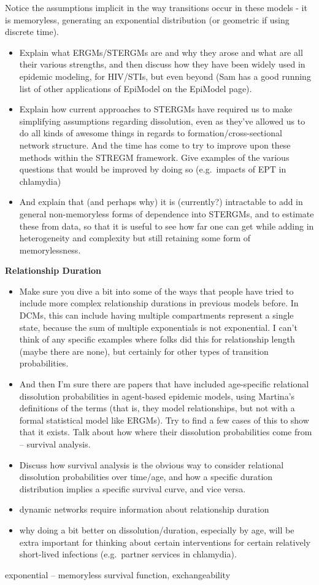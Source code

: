 \documentclass [11pt, proquest] {uwthesis}[2015/03/03]
\providecommand{\tightlist}{%
  \setlength{\itemsep}{0pt}\setlength{\parskip}{0pt}}
\begin{document}
Notice the assumptions implicit in the way transitions occur in these models - it is memoryless, generating an exponential distribution (or geometric if using discrete time).
\begin{itemize}
\tightlist
\item
  Explain what ERGMs/STERGMs are and why they arose and what are all their various strengths, and then discuss how they have been widely used in epidemic modeling, for HIV/STIs, but even beyond (Sam has a good running list of other applications of EpiModel on the EpiModel page).
\item
  Explain how current approaches to STERGMs have required us to make simplifying assumptions regarding dissolution, even as they've allowed us to do all kinds of awesome things in regards to formation/cross-sectional network structure. And the time has come to try to improve upon these methods within the STREGM framework. Give examples of the various questions that would be improved by doing so (e.g.~impacts of EPT in chlamydia)
\item
  And explain that (and perhaps why) it is (currently?) intractable to add in general non-memoryless forms of dependence into STERGMs, and to estimate these from data, so that it is useful to see how far one can get while adding in heterogeneity and complexity but still retaining some form of memorylessness.
\end{itemize}
\textbf{Relationship Duration}
\begin{itemize}
\item
  Make sure you dive a bit into some of the ways that people have tried to include more complex relationship durations in previous models before. In DCMs, this can include having multiple compartments represent a single state, because the sum of multiple exponentials is not exponential. I can't think of any specific examples where folks did this for relationship length (maybe there are none), but certainly for other types of transition probabilities.
\item
  And then I'm sure there are papers that have included age-specific relational dissolution probabilities in agent-based epidemic models, using Martina's definitions of the terms (that is, they model relationships, but not with a formal statistical model like ERGMs). Try to find a few cases of this to show that it exists. Talk about how where their dissolution probabilities come from -- survival analysis.\\
\item
  Discuss how survival analysis is the obvious way to consider relational dissolution probabilities over time/age, and how a specific duration distribution implies a specific survival curve, and vice versa.
\item
  dynamic networks require information about relationship duration
\item
  why doing a bit better on dissolution/duration, especially by age, will be extra important for thinking about certain interventions for certain relatively short-lived infections (e.g.~partner services in chlamydia).
\end{itemize}
exponential -- memoryless survival function, exchangeability
\end{document}
